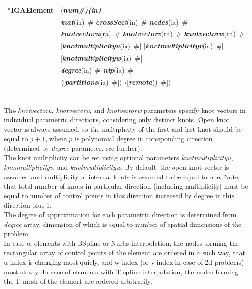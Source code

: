 \documentclass[a4paper]{article}
\makeatletter
\newcommand{\param}[1]{{\em #1}}
\newcommand{\fieldVal}[2]{\mbox{({\it\bf{#1}\#)\tiny (#2)}}}
\newcommand{\keywordnotype}[1]{\mbox{{\it{\bf{#1}}}}}
\newcommand{\keyword}[2]{\mbox{{\keywordnotype{#1}\tiny (#2)}}}
\newcommand{\entKeyword}[1]{\mbox{{*{\bf{#1}}}}}
\newcommand{\field}[2]{\mbox{\keyword{#1}{#2}~\#}}
\newcommand{\optField}[2]{\mbox{[\field{#1}{#2}]}}
\newcommand{\PoptField}[2]{\mbox{$\langle$[\field{#1}{#2}]$\rangle$}}
\newenvironment{record}[1][]{\begin{tabular}{|ll}}{\end{tabular}\\}
\newcommand{\recentry}[2]{{#1}&{#2}\\}
\newcounter{rcc}
\newenvironment{record}[1][\textwidth]{\setcounter{rcc}{0}\begin{tabular*}{#1}{|ll@{\extracolsep{\fill}}r}}{\end{tabular*}\\}
\newcommand{\recentry}[2]{\ifthenelse{\value{rcc}>0}{&$\backslash$ \\}{\setcounter{rcc}{1}}{#1}&{#2}}
\makeatother
\begin{document}
\noindent
\begin{record}
  \recentry{\entKeyword{IGAElement}}{\fieldVal{num}{in}}
  \recentry{}{\field{mat}{in} \field{crossSect}{in} \field{nodes}{ia}}
  \recentry{}{\field{knotvectoru}{ra} \field{knotvectorv}{ra} \field{knotvectorw}{ra}}
  \recentry{}{\optField{knotmultiplicityu}{ia} \optField{knotmultiplicityv}{ia}}
  \recentry{}{\optField{knotmultiplicityw}{ia}}
  \recentry{}{\field{degree}{ia} \field{nip}{ia}}
  \recentry{}{\PoptField{partitions}{ia} \PoptField{remote}{}}
\end{record}
The \param{knotvectoru}, \param{knotvectorv}, and \param{knotvectorw} parameters specify  knot vectors in individual parametric directions, considering only distinct knots. Open knot vector is always assumed, so the multiplicity of the first and last knot should be equal to $p+1$, where $p$ is polynomial degree in coresponding direction (determined by \param{degree} parameter, see further).\\
The knot multiplicity can be set using optional parameters \param{knotmultiplicityu}, \param{knotmultiplicityv}, and \param{knotmultiplicityw}. By default, the open knot vector is assumed and multiplicity of internal knots is assumed to be equal to one. Note, that total number of knots in particular direction (including multiplicity) must be equal to number of control points in this direction increased by degree in this direction plus 1.\\
The degree of approximation for each parametric direction is determined from \param{degree} array, dimension of which is equal to number of spatial dimensions of the problem.\\
In case of elements with BSpline or Nurbs interpolation, the nodes forming the rectangular array of control points of the element are ordered in a such way, that u-index is changing most quicly, and w-index (or v-index in case of 2d problems) most slowly. In case of elements with T-spline interpolation, the nodes forming the T-mesh of the element are ordered arbitrarily.
\end{document}
